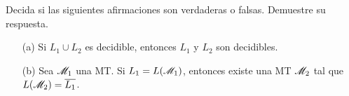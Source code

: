 Decida si las siguientes afirmaciones son verdaderas o falsas. Demuestre su respuesta.

\begin{enumerate}
    \item[(a)] Si $L_1\cup L_2$  es decidible, entonces $L_1$ y $L_2$ son decidibles.
    \item[(b)] Sea $\mathscr{M}_1$ una MT. Si $L_1=L(\mathscr{M}_1)$, entonces existe una MT $\mathscr{M}_2$ tal que $L(\mathscr{M}_2)=\overline{L_1}$.
\end{enumerate}
